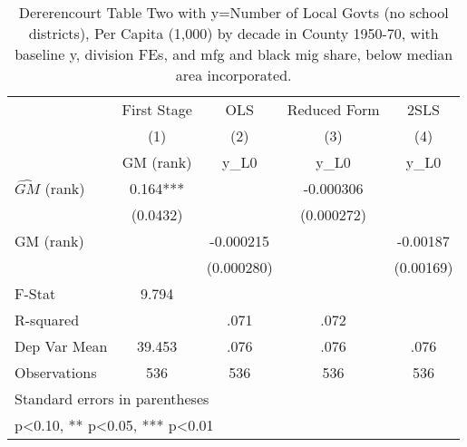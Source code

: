 \begin{table}[htbp]\centering
\def\sym#1{\ifmmode^{#1}\else\(^{#1}\)\fi}
\caption{Dererencourt Table Two with y=Number of Local Govts (no school districts), Per Capita (1,000) by decade in County 1950-70, with baseline y, division FEs, and mfg and black mig share, below median area incorporated.}
\begin{tabular}{l*{4}{c}}
\toprule
                    & First Stage   &         OLS   &Reduced Form   &        2SLS   \\
                    &\multicolumn{1}{c}{(1)}&\multicolumn{1}{c}{(2)}&\multicolumn{1}{c}{(3)}&\multicolumn{1}{c}{(4)}\\
                    &\multicolumn{1}{c}{GM  (rank)}&\multicolumn{1}{c}{y\_L0}&\multicolumn{1}{c}{y\_L0}&\multicolumn{1}{c}{y\_L0}\\
\midrule
$\hat{GM}$ (rank)   &       0.164***&               &   -0.000306   &               \\
                    &    (0.0432)   &               &  (0.000272)   &               \\
\addlinespace
GM  (rank)          &               &   -0.000215   &               &    -0.00187   \\
                    &               &  (0.000280)   &               &   (0.00169)   \\
\midrule
F-Stat              &       9.794   &               &               &               \\
R-squared           &               &        .071   &        .072   &               \\
Dep Var Mean        &      39.453   &        .076   &        .076   &        .076   \\
Observations        &         536   &         536   &         536   &         536   \\
\bottomrule
\multicolumn{5}{l}{\footnotesize Standard errors in parentheses}\\
\multicolumn{5}{l}{\footnotesize * p<0.10, ** p<0.05, *** p<0.01}\\
\end{tabular}
\end{table}
